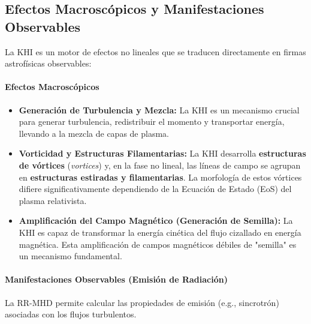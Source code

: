 \subsection{Efectos Macroscópicos y Manifestaciones Observables}

La KHI es un motor de efectos no lineales que se traducen directamente en firmas astrofísicas observables:

\paragraph{Efectos Macroscópicos}
\begin{itemize}
    \item \textbf{Generación de Turbulencia y Mezcla:} La KHI es un mecanismo crucial para generar turbulencia, redistribuir el momento y transportar energía, llevando a la mezcla de capas de plasma.
    \item \textbf{Vorticidad y Estructuras Filamentarias:} La KHI desarrolla \textbf{estructuras de vórtices} (\textit{vortices}) y, en la fase no lineal, las líneas de campo se agrupan en \textbf{estructuras estiradas y filamentarias}. La morfología de estos vórtices difiere significativamente dependiendo de la Ecuación de Estado (EoS) del plasma relativista.
    \item \textbf{Amplificación del Campo Magnético (Generación de Semilla):} La KHI es capaz de transformar la energía cinética del flujo cizallado en energía magnética. Esta amplificación de campos magnéticos débiles de "semilla" es un mecanismo fundamental.
\end{itemize}

\paragraph{Manifestaciones Observables (Emisión de Radiación)}

La RR-MHD permite calcular las propiedades de emisión (e.g., sincrotrón) asociadas con los flujos turbulentos.

